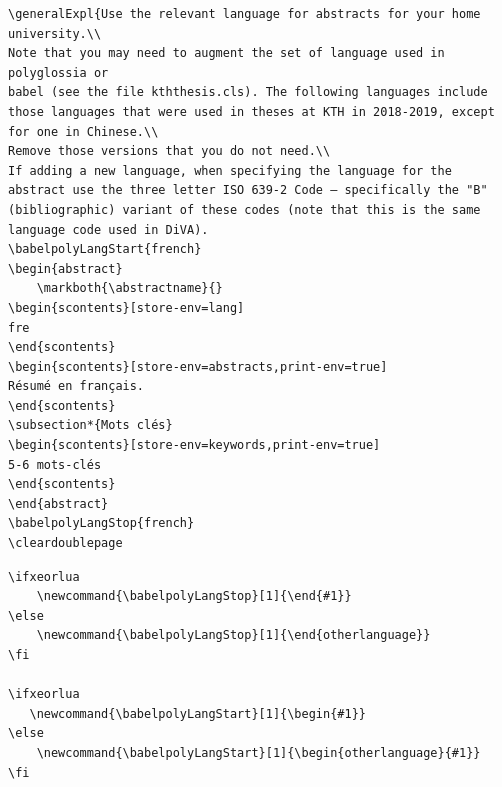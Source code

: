 \begin{lstlisting}[language={[LaTeX]TeX}, caption={Second example of the revised format for entering an abstract}, label=lst:babelSecondExample]
\generalExpl{Use the relevant language for abstracts for your home university.\\
Note that you may need to augment the set of language used in polyglossia or
babel (see the file kththesis.cls). The following languages include those languages that were used in theses at KTH in 2018-2019, except for one in Chinese.\\
Remove those versions that you do not need.\\
If adding a new language, when specifying the language for the abstract use the three letter ISO 639-2 Code – specifically the "B" (bibliographic) variant of these codes (note that this is the same language code used in DiVA).
\babelpolyLangStart{french}
\begin{abstract}
    \markboth{\abstractname}{}
\begin{scontents}[store-env=lang]
fre
\end{scontents}
\begin{scontents}[store-env=abstracts,print-env=true]
Résumé en français.
\end{scontents}
\subsection*{Mots clés}
\begin{scontents}[store-env=keywords,print-env=true]
5-6 mots-clés
\end{scontents}
\end{abstract}
\babelpolyLangStop{french}
\cleardoublepage
\end{lstlisting}
\begin{lstlisting}[language={[LaTeX]TeX}, caption={The two commands used to help enter the language specification}, label=lst:babelCMDS]
\ifxeorlua
    \newcommand{\babelpolyLangStop}[1]{\end{#1}}
\else
    \newcommand{\babelpolyLangStop}[1]{\end{otherlanguage}}
\fi

\ifxeorlua
   \newcommand{\babelpolyLangStart}[1]{\begin{#1}}
\else
    \newcommand{\babelpolyLangStart}[1]{\begin{otherlanguage}{#1}}
\fi
\end{lstlisting}


